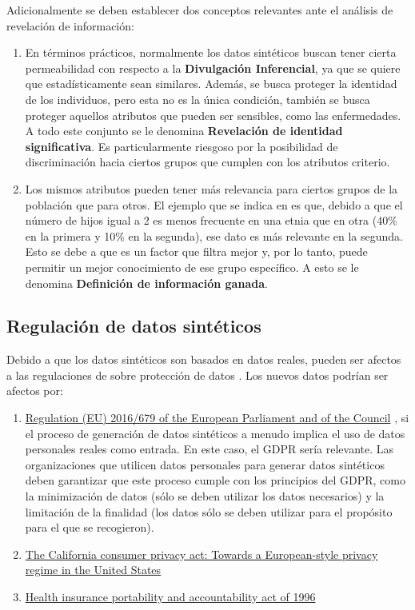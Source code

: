 Adicionalmente se deben establecer dos conceptos relevantes ante el análisis de revelación de información:
\begin{enumerate}
    \item En términos prácticos, normalmente los datos sintéticos buscan tener cierta permeabilidad con respecto a la \textbf{Divulgación Inferencial}, ya que se quiere que estadísticamente sean similares. Además, se busca proteger la identidad de los individuos, pero esta no es la única condición, también se busca proteger aquellos atributos que pueden ser sensibles, como las enfermedades. A todo este conjunto se le denomina \textbf{Revelación de identidad significativa}. Es particularmente riesgoso por la posibilidad de discriminación hacia ciertos grupos que cumplen con los atributos criterio.
    \item Los mismos atributos pueden tener más relevancia para ciertos grupos de la población que para otros. El ejemplo que se indica en \cite{el_emam_practical_2020} es que, debido a que el número de hijos igual a 2 es menos frecuente en una etnia que en otra (40\% en la primera y 10\% en la segunda), ese dato es más relevante en la segunda. Esto se debe a que es un factor que filtra mejor y, por lo tanto, puede permitir un mejor conocimiento de ese grupo específico. A esto se le denomina \textbf{Definición de información ganada}.
\end{enumerate}
\newpage

\subsection{Regulación de datos sintéticos}
Debido a que los datos sintéticos son basados en datos reales, pueden ser afectos a las regulaciones de sobre protección de datos \cite{bruce_practical_2020}. Los nuevos datos podrían ser afectos por:
\begin{enumerate}
    \item \href{https://dvbi.ru/Portals/0/DOCUMENTS_SHARE/RISK_MANAGEMENT/EBA/GDPR_eng_rus.pdf}{Regulation (EU) 2016/679 of the European Parliament and of the Council} \cite{regulation_regulation_2016}, si el proceso de generación de datos sintéticos a menudo implica el uso de datos personales reales como entrada. En este caso, el GDPR sería relevante. Las organizaciones que utilicen datos personales para generar datos sintéticos deben garantizar que este proceso cumple con los principios del GDPR, como la minimización de datos (sólo se deben utilizar los datos necesarios) y la limitación de la finalidad (los datos sólo se deben utilizar para el propósito para el que se recogieron).
    \item \href{https://heinonline.org/HOL/LandingPage?handle=hein.journals/jtlp23&div=5&id=&page=}{The California consumer privacy act: Towards a European-style privacy regime in the United States} \cite{pardau_california_2018}
    \item \href{http://www.eolusinc.com/pdf/hipaa.pdf}{Health insurance portability and accountability act of 1996} \cite{act_health_1996}
\end{enumerate}


